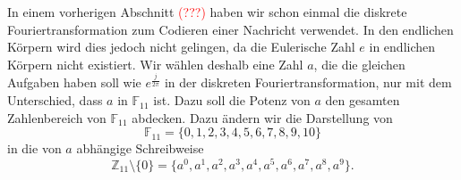 In einem vorherigen Abschnitt \textcolor{red}{(???)} haben wir schon einmal die diskrete Fouriertransformation zum Codieren einer Nachricht verwendet. In den endlichen Körpern wird dies jedoch nicht gelingen, da die Eulerische Zahl $e$ in endlichen Körpern nicht existiert.
Wir wählen deshalb eine Zahl $a$, die die gleichen Aufgaben haben soll wie $e^{\frac{j}{2 \pi}}$ in der diskreten Fouriertransformation, nur mit dem Unterschied, dass $a$ in $\mathbb{F}_{11}$ ist. Dazu soll die Potenz von $a$ den gesamten Zahlenbereich von $\mathbb{F}_{11}$ abdecken.
Dazu ändern wir die Darstellung von
\[
\mathbb{F}_{11} = \{0,1,2,3,4,5,6,7,8,9,10\}
\]
in die von $a$ abhängige Schreibweise 
\[
\mathbb{Z}_{11}\setminus\{0\} = \{a^0, a^1, a^2, a^3, a^4, a^5, a^6, a^7, a^8, a^9\}.
\]
%

